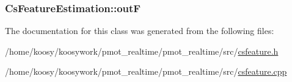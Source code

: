 \hypertarget{class_cs_feature_estimation_ae23cbdd6bb125898febbc39c86fe6ed7}{
\subsubsection[{out\-F}]{ {\bf \-Cs\-Feature\-Estimation\-::out\-F}}}\label{class_cs_feature_estimation_ae23cbdd6bb125898febbc39c86fe6ed7}


\-The documentation for this class was generated from the following files\-:\begin{DoxyCompactItemize}
\item 
/home/koosy/koosywork/pmot\-\_\-realtime/pmot\-\_\-realtime/src/\hyperlink{csfeature_8h}{csfeature.\-h}\item 
/home/koosy/koosywork/pmot\-\_\-realtime/pmot\-\_\-realtime/src/\hyperlink{csfeature_8cpp}{csfeature.\-cpp}\end{DoxyCompactItemize}
